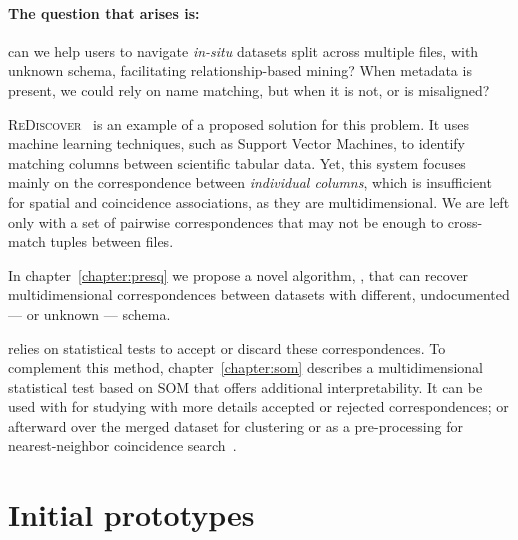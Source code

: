 \paragraph{The question that arises is:} can we help users to navigate \textit{in-situ} datasets
split across multiple files, with unknown schema, facilitating relationship-based mining?
When metadata is present, we could rely on name matching, but when it is not, or is misaligned?

\textsc{ReDiscover}~\cite{alawini2016} is an example of a proposed solution for this problem.
It uses machine learning techniques, such as Support Vector Machines, to identify matching
columns between scientific tabular data.
Yet, this system focuses mainly on the correspondence between \emph{individual columns},
which is insufficient for spatial and coincidence associations, as they are multidimensional.
We are left only with a set of pairwise correspondences that may not be enough to cross-match
tuples between files.

In chapter~\ref{chapter:presq} we propose a novel algorithm, \PresQ, that can recover
multidimensional correspondences between datasets with different, undocumented --- or unknown --- schema.

\PresQ relies on statistical tests to accept or discard these correspondences.
To complement this method, chapter~\ref{chapter:som} describes a multidimensional
statistical test based on \gls{SOM} that offers additional interpretability. It can be used
with \PresQ for studying with more details accepted or rejected correspondences;
or afterward over the merged dataset for clustering or as a pre-processing for nearest-neighbor
coincidence search~\cite{silva2011som}.



\section{Initial prototypes}

